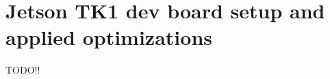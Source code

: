 \section{Jetson TK1 dev board setup and applied optimizations}
\label{sec:implementations_jetson}

TODO!!
